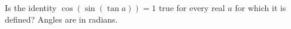 Is the identity $\cos(\sin(\tan a))=1$ true for every real $a$ for which it is defined? Angles are in radians.
